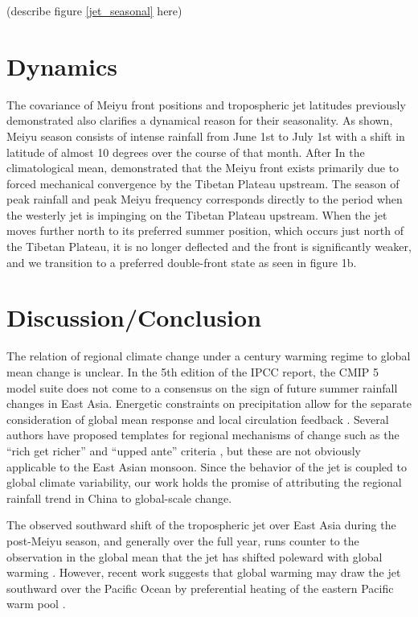 \documentclass[draft,grl]{AGUTeX}
\begin{document}
\begin{article}
(describe figure \ref{jet_seasonal} here) 

\section{Dynamics}

	The covariance of Meiyu front positions and tropospheric jet latitudes previously demonstrated also clarifies a dynamical reason for their seasonality. As shown, Meiyu season consists of intense rainfall from June 1st to July 1st with a shift in latitude of almost 10 degrees over the course of that month. After  In the climatological mean, \cite{Chen2014} demonstrated that the Meiyu front exists primarily due to forced mechanical convergence by the Tibetan Plateau upstream. The season of peak rainfall and peak Meiyu frequency corresponds directly to the period when the westerly jet is impinging on the Tibetan Plateau upstream. When the jet moves further north to its preferred summer position, which occurs just north of the Tibetan Plateau, it is no longer deflected and the front is significantly weaker, and we transition to a preferred double-front state as seen in figure 1b. 

\section{Discussion/Conclusion}

The relation of regional climate change under a  century warming regime to global mean change is unclear. In the 5th edition of the IPCC report, the CMIP 5 model suite does not come to a consensus on the sign of future summer rainfall changes in East Asia\citep{Christensen2011}. Energetic constraints on precipitation allow for the separate consideration of global mean response and local circulation feedback \citep{Muller2011}. Several authors have proposed templates for regional mechanisms of change such as the ``rich get richer'' and ``upped ante'' criteria \citep{Held2006,Lintner2007,Chou2009}, but these are not obviously applicable to the East Asian monsoon. Since the behavior of the jet is coupled to global climate variability, our work holds the promise of attributing the regional rainfall trend in China to global-scale change.

The observed southward shift of the tropospheric jet over East Asia during the post-Meiyu season, and generally over the full year, runs counter to the observation in the global mean that the jet has shifted poleward with global warming \CITATIONS. However, recent work suggests that global warming may draw the jet southward over the Pacific Ocean by preferential heating of the eastern Pacific warm pool \citep{Park2014}.


\end{article}
\end{document}
